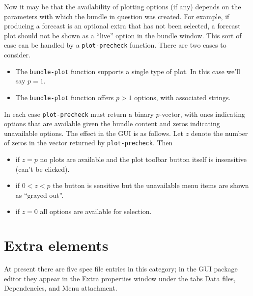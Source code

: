 \documentclass[oneside]{book}
\begin{document}
Now it may be that the availability of plotting options (if any)
depends on the parameters with which the bundle in question was
created. For example, if producing a forecast is an optional extra
that has not been selected, a forecast plot should not be shown as a
``live'' option in the bundle window. This sort of case can be handled
by a \texttt{plot-precheck} function. There are two cases to consider.
\begin{itemize}
\item The \texttt{bundle-plot} function supports a single type of
  plot. In this case we'll say $p = 1$.
\item The \texttt{bundle-plot} function offers $p > 1$ options, with
  associated strings.
\end{itemize}
In each case \texttt{plot-precheck} must return a binary $p$-vector,
with ones indicating options that are available given the bundle content
and zeros indicating unavailable options. The effect in the GUI is as
follows. Let $z$ denote the number of zeros in the vector returned by
\texttt{plot-precheck}. Then
\begin{itemize}
\item if $z = p$ no plots are available and the plot toolbar button
  itself is insensitive (can't be clicked).
\item if $0 < z < p$ the button is sensitive but the unavailable menu
  items are shown as ``grayed out''.
\item if $z = 0$ all options are available for selection.
\end{itemize}

\section{Extra elements}
\label{sec:spec-extra}

At present there are five spec file entries in this category; in the
GUI package editor they appear in the \textsf{Extra properties} window
under the tabs \textsf{Data files}, \textsf{Dependencies}, and
\textsf{Menu attachment}.
\end{document}
